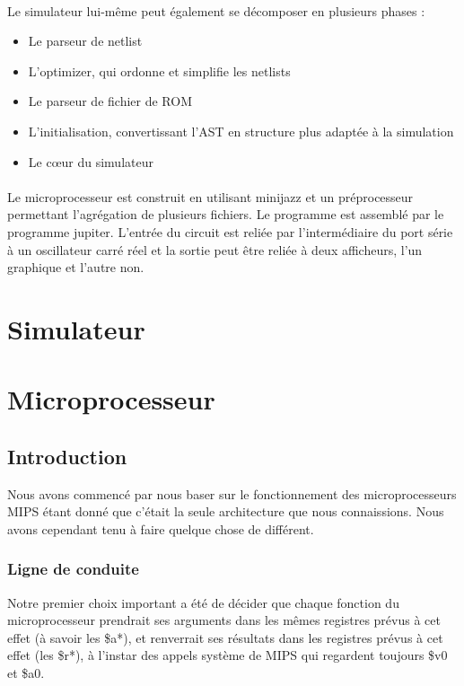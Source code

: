 \documentclass{article}
\begin{document}
\paragraph{}Le simulateur lui-même peut également se décomposer en plusieurs phases :
\begin{itemize}
	\item Le parseur de netlist
	\item L'optimizer, qui ordonne et simplifie les netlists
	\item Le parseur de fichier de ROM
	\item L'initialisation, convertissant l'AST en structure plus adaptée à la simulation
	\item Le cœur du simulateur
\end{itemize}


\paragraph{}Le microprocesseur est construit en utilisant minijazz et un préprocesseur permettant l'agrégation de plusieurs fichiers. Le programme est assemblé par le programme jupiter. L'entrée du circuit est reliée par l'intermédiaire du port série à un oscillateur carré réel et la sortie peut être reliée à deux afficheurs, l'un graphique et l'autre non.



\section{Simulateur}



\section{Microprocesseur}
\subsection{Introduction}

Nous avons commencé par nous baser sur le fonctionnement des microprocesseurs
MIPS étant donné que c'était la seule architecture que nous connaissions.
Nous avons cependant tenu à faire quelque chose de différent.

\subsubsection{Ligne de conduite}
Notre premier choix important a été de décider que chaque fonction du
microprocesseur prendrait ses arguments dans les mêmes registres prévus à cet effet
(à savoir les \$a*), et renverrait ses résultats dans les registres prévus à
cet effet (les \$r*), à l'instar des appels système de MIPS qui regardent
toujours \$v0 et \$a0.
\end{document}
